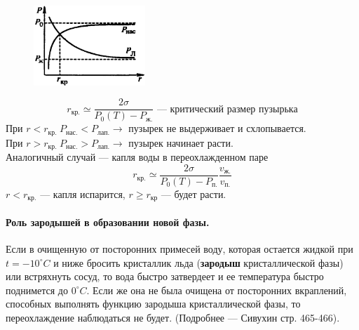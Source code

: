 \begin{figure}
	\includegraphics[width=42mm]{ris24.png}
\end{figure}
$$r_\text{кр.}\simeq\dfrac{2\sigma}{P_0(T)-P_\text{ж.}}\textbf{ --- критический размер пузырька}$$
При $r<r_\text{кр. }P_\text{нас.}<P_\text{лап.}\rightarrow$ пузырек не выдерживает и схлопывается.\\
При $r>r_\text{кр. }P_\text{нас.}>P_\text{лап.}\rightarrow$ пузырек начинает расти.\\[0.5cm]
Аналогичный случай --- капля воды в переохлажденном паре
$$r_\text{кр.}\simeq\dfrac{2\sigma}{P_0(T)-P_\text{п.}}\dfrac{v_\text{ж.}}{v_\text{п.}}$$
$r<r_\text{кр.}$ --- капля испарится, $r\geqslant r_\text{кр}$ --- будет расти.
\paragraph{Роль	зародышей в образовании новой фазы.} Если в очищенную от посторонних примесей воду, которая остается жидкой при $t=-10^\circ C$ и ниже бросить кристаллик льда (\textbf{зародыш} кристаллической фазы) или встряхнуть сосуд, то вода быстро затвердеет и ее температура быстро поднимется до $0^\circ C$. Если же она не была очищена от посторонних вкраплений, способных выполнять функцию зародыша кристаллической фазы, то переохлаждение наблюдаться не будет. (Подробнее --- Сивухин стр. 465-466).
